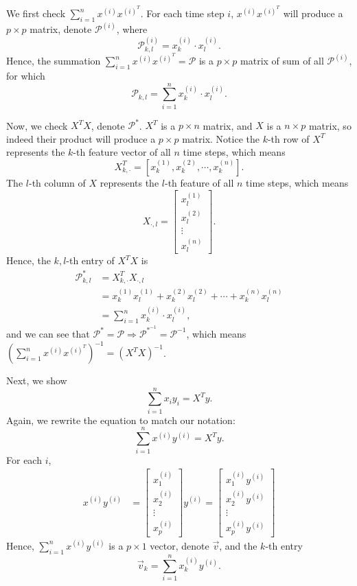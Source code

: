 \documentclass[
]{article}
\begin{document}
We first check \(\sum_{i=1}^{n}x^{(i)}x^{(i)^T}\). For each time step
\(i\), \(x^{(i)}x^{(i)^T}\) will produce a \(p\times p\) matrix, denote
\(\mathcal{P}^{(i)}\), where
\[\mathcal{P}_{k,l}^{(i)} = x_k^{(i)}\cdot x_l^{(i)}.\] Hence, the
summation \(\sum_{i=1}^{n}x^{(i)}x^{(i)^T} = \mathcal{P}\) is a
\(p\times p\) matrix of sum of all \(\mathcal{P}^{(i)}\), for which
\[\mathcal{P}_{k,l} = \sum_{i=1}^{n}x_k^{(i)}\cdot x_l^{(i)}.\]

Now, we check \(X^TX\), denote \(\mathcal{P}^*\). \(X^T\) is a
\(p\times n\) matrix, and \(X\) is a \(n\times p\) matrix, so indeed
their product will produce a \(p\times p\) matrix. Notice the \(k\)-th
row of \(X^T\) represents the \(k\)-th feature vector of all \(n\) time
steps, which means
\[X^T_{k,\cdot} = \left[x_k^{(1)}, x_k^{(2)}, \cdots, x_k^{(n)}\right].\]
The \(l\)-th column of \(X\) represents the \(l\)-th feature of all
\(n\) time steps, which means \[X_{\cdot,l} = \begin{bmatrix}
    x_{l}^{(1)} \\
    x_{l}^{(2)} \\
    \vdots \\
    x_{l}^{(n)}
  \end{bmatrix}.\] Hence, the \(k,l\)-th entry of \(X^TX\) is
\begin{align*}
    \mathcal{P}^*_{k,l} & = X^T_{k,\cdot}X_{\cdot,l} \\
    & = x_k^{(1)}x_l^{(1)} + x_k^{(2)}x_l^{(2)} + \cdots + x_k^{(n)}x_l^{(n)} \\
    & = \sum_{i=1}^{n}x_k^{(i)}\cdot x_l^{(i)},
\end{align*} and we can see that
\(\mathcal{P}^* = \mathcal{P}\Rightarrow\mathcal{P}^{*^{-1}} = \mathcal{P}^{-1}\),
which means
\(\left(\sum_{i=1}^{n}x^{(i)}x^{(i)^T}\right)^{-1} = \left(X^TX\right)^{-1}\).

Next, we show \[\sum_{i=1}^{n}x_iy_i = X^Ty.\] Again, we rewrite the
equation to match our notation: \[\sum_{i=1}^{n}x^{(i)}y^{(i)} = X^Ty.\]
For each \(i\), \begin{align*}
    x^{(i)}y^{(i)} & = 
    \begin{bmatrix}
        x_1^{(i)} \\
        x_2^{(i)} \\
        \vdots \\
        x_p^{(i)}
      \end{bmatrix}y^{(i)} = 
    \begin{bmatrix}
        x_1^{(i)}y^{(i)} \\
        x_2^{(i)}y^{(i)} \\
        \vdots \\
        x_p^{(i)}y^{(i)}
      \end{bmatrix}
\end{align*} Hence, \(\sum_{i=1}^{n}x^{(i)}y^{(i)}\) is a \(p\times 1\)
vector, denote \(\vec{v}\), and the \(k\)-th entry
\[\vec{v}_k = \sum_{i=1}^{n}x_k^{(i)}y^{(i)}.\]
\end{document}
